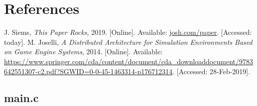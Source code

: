 \documentclass[a4paper, 12pt]{article}
\begin{document}
\newpage

\section{References}

    \begin{thebibliography}{9}
            J. Siems, \textit{This Paper Rocks}, 2019. [Online]. Available: \url{josh.com/paper}. [Accessed: today].
            M. Joselli, \textit{A Distributed Architecture for Simulation Environments Based on Game Engine Systems}, 2014. [Online]. Available: \url{https://www.springer.com/cda/content/document/cda_downloaddocument/9783642551307-c2.pdf?SGWID=0-0-45-1463314-p176712314}. [Accessed: 28-Feb-2019].
    \end{thebibliography}

\newpage

\begin{appendices}

\section{main.c}

\end{appendices}
\end{document}

